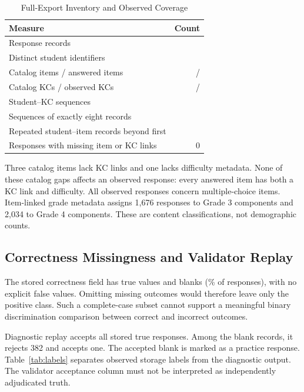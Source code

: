 \documentclass[conference]{IEEEtran}
\begin{document}
\begin{table}[t]
\caption{Full-Export Inventory and Observed Coverage}
\label{tab:inventory}
\centering
\begin{tabular}{lr}
\hline
Measure & Count \\
\hline
Response records & \ResponseCount{} \\
Distinct student identifiers & \StudentIDCount{} \\
Catalog items / answered items & \CatalogItemCount{} / \ObservedItemCount{} \\
Catalog KCs / observed KCs & \CatalogKCCount{} / \ObservedKCCount{} \\
Student--KC sequences & \SequenceCount{} \\
Sequences of exactly eight records & \EightSequenceCount{} \\
Repeated student--item records beyond first & \RepeatCount{} \\
Responses with missing item or KC links & 0 \\
\hline
\end{tabular}
\end{table}

Three catalog items lack KC links and one lacks difficulty metadata. None of these catalog gaps affects an observed response: every answered item has both a KC link and difficulty. All observed responses concern multiple-choice items. Item-linked grade metadata assigns 1,676 responses to Grade 3 components and 2,034 to Grade 4 components. These are content classifications, not demographic counts.

\subsection{Correctness Missingness and Validator Replay}
The stored correctness field has \TrueCount{} true values and \BlankCount{} blanks (\BlankPercent{}\% of responses), with no explicit false values. Omitting missing outcomes would therefore leave only the positive class. Such a complete-case subset cannot support a meaningful binary discrimination comparison between correct and incorrect outcomes.

Diagnostic replay accepts all \TrueCount{} stored true responses. Among the blank records, it rejects 382 and accepts one. The accepted blank is marked as a practice response. Table~\ref{tab:labels} separates observed storage labels from the diagnostic output. The validator acceptance column must not be interpreted as independently adjudicated truth.
\end{document}
